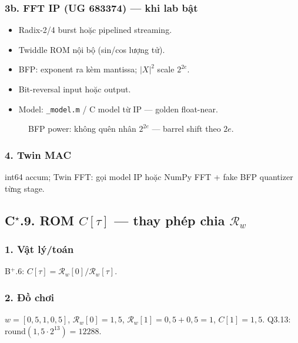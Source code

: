 \subsubsection*{3b. FFT IP (UG 683374) --- khi lab bật}
\begin{itemize}\setlength{\itemsep}{1pt}
\item Radix-2/4 burst hoặc pipelined streaming.
\item Twiddle ROM nội bộ (sin/cos lượng tử).
\item BFP: exponent ra kèm mantissa; $|X|^2$ scale $2^{2e}$.
\item Bit-reversal input hoặc output.
\item Model: \texttt{\_model.m} / C model từ IP --- golden float-near.
\end{itemize}

\begin{figure}[H]
\centering
{}
\caption{BFP power: không quên nhân $2^{2e}$ --- barrel shift theo $2e$.}
\end{figure}

\subsubsection*{4. Twin MAC} int64 accum; Twin FFT: gọi model IP hoặc NumPy FFT + fake BFP quantizer từng stage.

\subsection*{C$^\star$.9. ROM $C[\tau]$ --- thay phép chia $\mathcal{R}_w$}

\subsubsection*{1. Vật lý/toán} B$^+$.6: $C[\tau]=\mathcal{R}_w[0]/\mathcal{R}_w[\tau]$.

\subsubsection*{2. Đồ chơi}
$w=[0{,}5,1,0{,}5]$, $\mathcal{R}_w[0]=1{,}5$, $\mathcal{R}_w[1]=0{,}5+0{,}5=1$, $C[1]=1{,}5$. Q3.13: $\mathrm{round}(1{,}5\cdot2^{13})=12288$.

